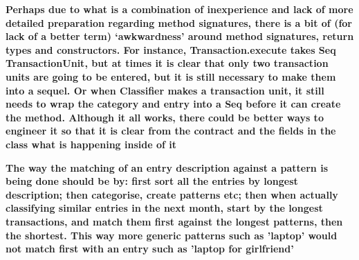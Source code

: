 \textbf{Perhaps due to what is a combination of inexperience and lack of more
detailed preparation regarding method signatures, there is a bit of (for lack
of a better term) `awkwardness' around method signatures, return types and
constructors. For instance, Transaction.execute takes Seq TransactionUnit, but
at times it is clear that only two transaction units are going to be entered,
but it is still necessary to make them into a sequel. Or when Classifier makes
a transaction unit, it still needs to wrap the category and entry into a Seq
before it can create the method. Although it all works, there could be better
ways to engineer it so that it is clear from the contract and the fields in the
class what is happening inside of it}

\textbf{The way the matching of an entry description against a pattern is being
done should be by: first sort all the entries by longest description;
then categorise, create patterns etc; then when actually classifying similar
entries in the next month, start by the longest transactions, and match them
first against the longest patterns, then the shortest. This way more generic
patterns such as 'laptop' would not match first with an entry such as 'laptop
for girlfriend'}
